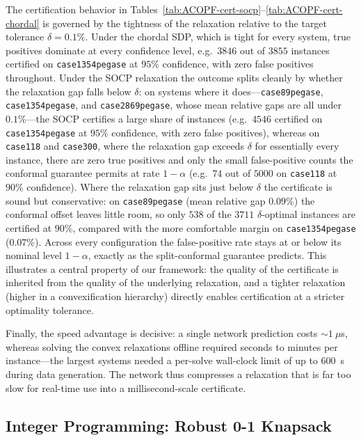 \documentclass[10pt]{article} %
\theoremstyle{plain}
\theoremstyle{definition}
\theoremstyle{remark}
\begin{document}
The certification behavior in Tables~\ref{tab:ACOPF-cert-socp}--\ref{tab:ACOPF-cert-chordal} is governed by the tightness of the relaxation relative to the target tolerance $\delta = 0.1\%$. Under the chordal SDP, which is tight for every system, true positives dominate at every confidence level, e.g.\ $3846$ out of $3855$ instances certified on \texttt{case1354pegase} at $95\%$ confidence, with zero false positives throughout. Under the SOCP relaxation the outcome splits cleanly by whether the relaxation gap falls below $\delta$: on systems where it does---\texttt{case89pegase}, \texttt{case1354pegase}, and \texttt{case2869pegase}, whose mean relative gaps are all under $0.1\%$---the SOCP certifies a large share of instances (e.g.\ $4546$ certified on \texttt{case1354pegase} at $95\%$ confidence, with zero false positives), whereas on \texttt{case118} and \texttt{case300}, where the relaxation gap exceeds $\delta$ for essentially every instance, there are zero true positives and only the small false-positive counts the conformal guarantee permits at rate $1-\alpha$ (e.g.\ $74$ out of $5000$ on \texttt{case118} at $90\%$ confidence). Where the relaxation gap sits just below $\delta$ the certificate is sound but conservative: on \texttt{case89pegase} (mean relative gap $0.09\%$) the conformal offset leaves little room, so only $538$ of the $3711$ $\delta$-optimal instances are certified at $90\%$, compared with the more comfortable margin on \texttt{case1354pegase} ($0.07\%$). Across every configuration the false-positive rate stays at or below its nominal level $1-\alpha$, exactly as the split-conformal guarantee predicts. This illustrates a central property of our framework: the quality of the certificate is inherited from the quality of the underlying relaxation, and a tighter relaxation (higher in a convexification hierarchy) directly enables certification at a stricter optimality tolerance.

Finally, the speed advantage is decisive: a single network prediction costs $\sim\!1~\mu$s, whereas solving the convex relaxations offline required seconds to minutes per instance---the largest systems needed a per-solve wall-clock limit of up to $600$~s during data generation. The network thus compresses a relaxation that is far too slow for real-time use into a millisecond-scale certificate.

\subsection{Integer Programming: Robust 0-1 Knapsack}
\end{document}
